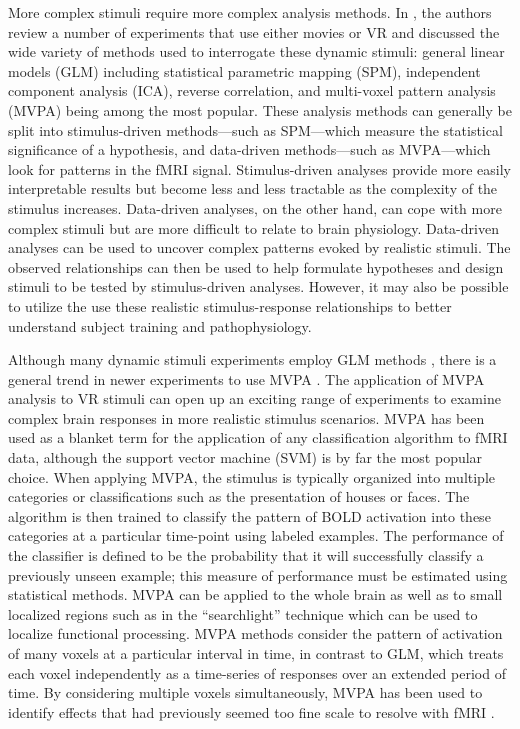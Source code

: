 \documentclass{article}
\begin{document}
More complex stimuli require more complex analysis methods.
In \cite{Spiers2007}, the authors review a number of experiments that use either movies or VR and discussed the wide variety of methods used to interrogate these dynamic stimuli: general linear models (GLM) including statistical parametric mapping (SPM), independent component analysis (ICA), reverse correlation, and multi-voxel pattern analysis (MVPA) being among the most popular.
These analysis methods can generally be split into stimulus-driven methods---such as SPM---which measure the statistical significance of a hypothesis, and data-driven methods---such as MVPA---which look for patterns in the fMRI signal.
Stimulus-driven analyses provide more easily interpretable results but become less and less tractable as the complexity of the stimulus increases.
Data-driven analyses, on the other hand, can cope with more complex stimuli but are more difficult to relate to brain physiology.
Data-driven analyses can be used to uncover complex patterns evoked by realistic stimuli. The observed relationships can then be used to help formulate hypotheses and design stimuli to be tested by stimulus-driven analyses. However, it may also be possible to utilize the use these realistic stimulus-response relationships to better understand subject training and pathophysiology.

Although many dynamic stimuli experiments employ GLM methods \citep{Maguire1998,Calhoun2002,King2006,Mathiak2006,Spiers2007a}, there is a general trend in newer experiments to use MVPA \citep{Hassabis2009,Chadwick2010,Haxby2001,Mitchell2003,Haynes2006}. The application of MVPA analysis to VR stimuli can open up an exciting range of experiments to examine complex brain responses in more realistic stimulus scenarios.
MVPA has been used as a blanket term for the application of any classification algorithm to fMRI data, although the support vector machine (SVM) is by far the most popular choice.
When applying MVPA, the stimulus is typically organized into multiple categories or classifications such as the presentation of houses or faces.
The algorithm is then trained to classify the pattern of BOLD activation into these categories at a particular time-point using labeled examples.
The performance of the classifier is defined to be the probability that it will successfully classify a previously unseen example;
this measure of performance must be estimated using statistical methods.
MVPA can be applied to the whole brain as well as to small localized regions such as in the ``searchlight'' technique \citep{Kriegeskorte2006} which can be used to localize functional processing.
MVPA methods consider the pattern of activation of many voxels at a particular interval in time, in contrast to GLM, which treats each voxel independently as a time-series of responses over an extended period of time.
By considering multiple voxels simultaneously, MVPA has been used to identify effects that had previously seemed too fine scale to resolve with fMRI \citep{Kamitani2005,Hassabis2009}.
\end{document}
